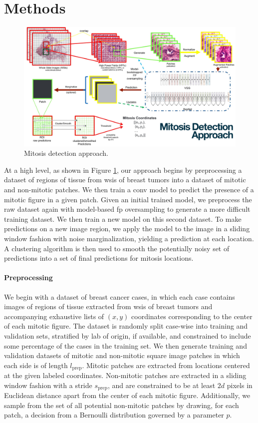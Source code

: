 \section{Methods}

\begin{figure}
  \includegraphics[width=\linewidth]{assets/diagram}
  \caption{Mitosis detection approach.}
  \label{fig:approach}
\end{figure}

At a high level, as shown in  Figure \ref{fig:approach}, our approach begins by preprocessing a dataset of regions of tissue from \glspl{wsi} of breast tumors into a dataset of mitotic and non-mitotic patches.  We then train a \gls{conv} model to predict the presence of a mitotic figure in a given patch.  Given an initial trained model, we preprocess the raw dataset again with model-based \gls{fp} oversampling to generate a more difficult training dataset.  We then train a new model on this second dataset.  To make predictions on a new image region, we apply the model to the image in a sliding window fashion with noise marginalization, yielding a prediction at each location.  A clustering algorithm is then used to smooth the potentially noisy set of predictions into a set of final predictions for mitosis locations.

\paragraph{Preprocessing}
\label{par:prep}
We begin with a dataset of breast cancer cases, in which each case contains images of regions of tissue extracted from \glspl{wsi} of breast tumors and accompanying exhaustive lists of $(x,y)$ coordinates corresponding to the center of each mitotic figure.  The dataset is randomly split case-wise into training and validation sets, stratified by lab of origin, if available, and constrained to include some percentage of the cases in the training set.  We then generate training and validation datasets of mitotic and non-mitotic square image patches in which each side is of length $l_\text{prep}$.  Mitotic patches are extracted from locations centered at the given labeled coordinates.  Non-mitotic patches are extracted in a sliding window fashion with a stride $s_\text{prep}$, and are constrained to be at least $2d$ pixels in Euclidean distance apart from the center of each mitotic figure. Additionally, we sample from the set of all potential non-mitotic patches by drawing, for each patch, a decision from a Bernoulli distribution governed by a parameter $p$.


